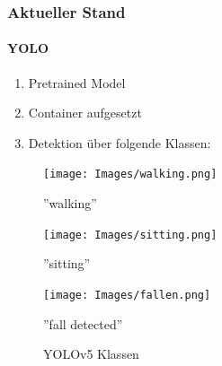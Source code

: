 \documentclass[]{beamer}
\begin{document}
\begin{frame}
	\frametitle{Aktueller Stand}
	\framesubtitle{YOLO}
	
		\begin{enumerate}
		\item Pretrained Model
		\item Container aufgesetzt
		\item Detektion über folgende Klassen:
	\end{enumerate}
	
	\begin{figure}
		\centering
		\begin{minipage}[t]{0.3\textwidth}
			\centering
			\texttt{[image: Images/walking.png]}
			\caption*{''walking''}
		\end{minipage}
		\hfill
		\begin{minipage}[t]{0.3\textwidth}
			\centering
			\texttt{[image: Images/sitting.png]}
			\caption*{''sitting''}
		\end{minipage}
		\hfill
		\begin{minipage}[t]{0.3\textwidth}
			\centering
			\texttt{[image: Images/fallen.png]}
			\caption*{ ''fall detected''}
		\end{minipage}
		\caption{YOLOv5 Klassen}
		\label{fig:yolo_classes}
	\end{figure}

\end{frame}
\end{document}
